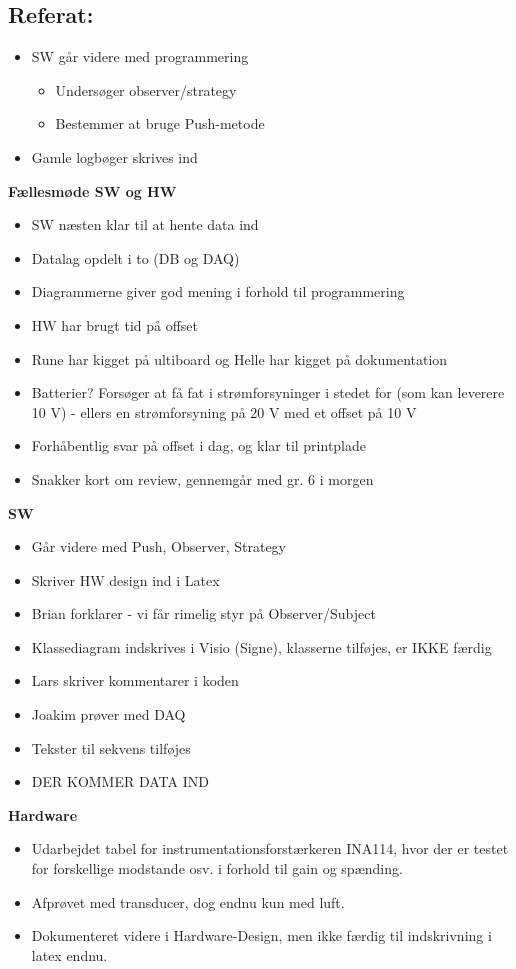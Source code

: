 \documentclass[a4paper,11pt,oneside]{memoir}
\begin{document}
\subsection{Referat:}
\begin{itemize}
\item SW går videre med programmering 
\begin{itemize}
\item Undersøger observer/strategy
\item Bestemmer at bruge Push-metode
\end{itemize}
\item Gamle logbøger skrives ind 
\end{itemize}
\textbf{Fællesmøde SW og HW}
\begin{itemize}
\item SW næsten klar til at hente data ind 
\item Datalag opdelt i to (DB og DAQ)
\item Diagrammerne giver god mening i forhold til programmering 
\item HW har brugt tid på offset 
\item Rune har kigget på ultiboard og Helle har kigget på dokumentation 
\item Batterier? Forsøger at få fat i strømforsyninger i stedet for (som kan leverere 10 V) - ellers en strømforsyning på 20 V med et offset på 10 V
\item Forhåbentlig svar på offset i dag, og klar til printplade
\item Snakker kort om review, gennemgår med gr. 6 i morgen
\end{itemize}
\textbf{SW}
\begin{itemize}
\item Går videre med Push, Observer, Strategy
\item Skriver HW design ind i Latex
\item Brian forklarer - vi får rimelig styr på Observer/Subject
\item Klassediagram indskrives i Visio (Signe), klasserne tilføjes, er IKKE færdig
\item Lars skriver kommentarer i koden
\item Joakim prøver med DAQ
\item Tekster til sekvens tilføjes
\item DER KOMMER DATA IND
\end{itemize}
\textbf{Hardware}
\begin{itemize}
\item Udarbejdet tabel for instrumentationsforstærkeren INA114, hvor der er testet for forskellige modstande osv. i forhold til gain og spænding. 
\item Afprøvet med transducer, dog endnu kun med luft.
\item Dokumenteret videre i Hardware-Design, men ikke færdig til indskrivning i latex endnu.
\end{itemize}
\end{document}
